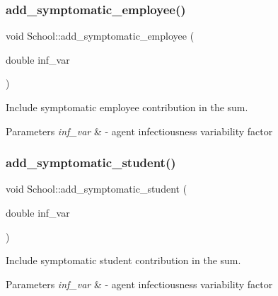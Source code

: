 \subsubsection{\texorpdfstring{add\+\_\+symptomatic\+\_\+employee()}{add\_symptomatic\_employee()}}
{\footnotesize\ttfamily void School\+::add\+\_\+symptomatic\+\_\+employee (\begin{DoxyParamCaption}\item[{double}]{inf\+\_\+var }\end{DoxyParamCaption})\hspace{0.3cm}{\ttfamily [inline]}}



Include symptomatic employee contribution in the sum. 


\begin{DoxyParams}{Parameters}
{\em inf\+\_\+var} & -\/ agent infectiousness variability factor \\
\hline
\end{DoxyParams}
\mbox{\label{classSchool_ac5457e1834cbf399c4c9ad8a6971673f}} 
\subsubsection{\texorpdfstring{add\+\_\+symptomatic\+\_\+student()}{add\_symptomatic\_student()}}
{\footnotesize\ttfamily void School\+::add\+\_\+symptomatic\+\_\+student (\begin{DoxyParamCaption}\item[{double}]{inf\+\_\+var }\end{DoxyParamCaption})\hspace{0.3cm}{\ttfamily [inline]}}



Include symptomatic student contribution in the sum. 


\begin{DoxyParams}{Parameters}
{\em inf\+\_\+var} & -\/ agent infectiousness variability factor \\
\hline
\end{DoxyParams}
\mbox{\label{classSchool_aba41cef9af3f2cb98bf1075c289baf84}} 
